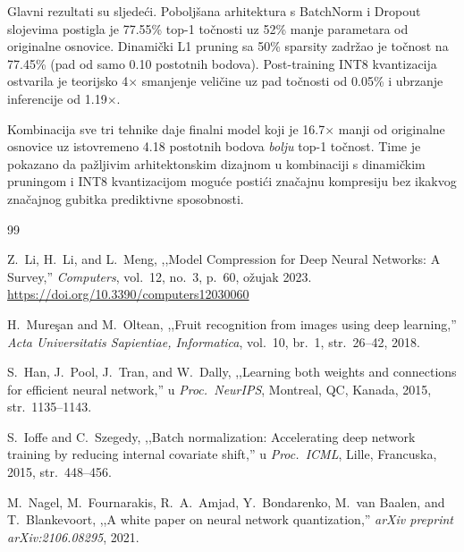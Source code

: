 \documentclass[letterpaper, 10 pt, conference]{ieeeconf}
\begin{document}
Glavni rezultati su sljedeći.
Poboljšana arhitektura s BatchNorm i Dropout slojevima postigla je 77.55\% top-1 točnosti uz 52\% manje parametara od originalne osnovice.
Dinamički L1 pruning sa 50\% sparsity zadržao je točnost na 77.45\% (pad od samo 0.10 postotnih bodova).
Post-training INT8 kvantizacija ostvarila je teorijsko 4$\times$ smanjenje veličine uz pad točnosti od 0.05\% i ubrzanje inferencije od 1.19$\times$.

Kombinacija sve tri tehnike daje finalni model koji je 16.7$\times$ manji od originalne osnovice uz istovremeno 4.18 postotnih bodova \textit{bolju} top-1 točnost.
Time je pokazano da pažljivim arhitektonskim dizajnom u kombinaciji s dinamičkim pruningom i INT8 kvantizacijom moguće postići značajnu kompresiju bez ikakvog značajnog gubitka prediktivne sposobnosti.


\begin{thebibliography}{99}

Z.\ Li, H.\ Li, and L.\ Meng,
,,Model Compression for Deep Neural Networks: A Survey,''
\textit{Computers}, vol.~12, no.~3, p.~60, ožujak 2023.
\url{https://doi.org/10.3390/computers12030060}

H.\ Mure\c{s}an and M.\ Oltean,
,,Fruit recognition from images using deep learning,''
\textit{Acta Universitatis Sapientiae, Informatica},
vol.~10, br.~1, str.~26--42, 2018.

S.\ Han, J.\ Pool, J.\ Tran, and W.\ Dally,
,,Learning both weights and connections for efficient neural network,''
u \textit{Proc.\ NeurIPS}, Montreal, QC, Kanada, 2015, str.~1135--1143.

S.\ Ioffe and C.\ Szegedy,
,,Batch normalization: Accelerating deep network training by reducing internal covariate shift,''
u \textit{Proc.\ ICML}, Lille, Francuska, 2015, str.~448--456.

M.\ Nagel, M.\ Fournarakis, R.\ A.\ Amjad, Y.\ Bondarenko,
M.\ van Baalen, and T.\ Blankevoort,
,,A white paper on neural network quantization,''
\textit{arXiv preprint arXiv:2106.08295}, 2021.

\end{thebibliography}
\end{document}
